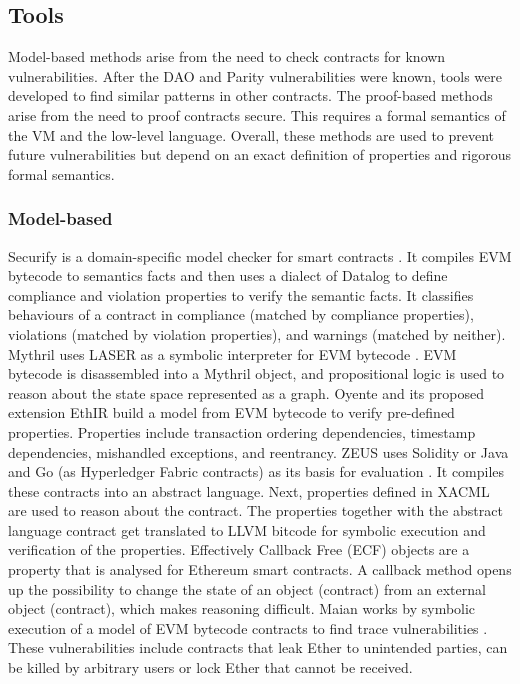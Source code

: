 


\subsection{Tools}
Model-based methods arise from the need to check contracts for known vulnerabilities. After the DAO and Parity vulnerabilities were known, tools were developed to find similar patterns in other contracts. The proof-based methods arise from the need to proof contracts secure. This requires a formal semantics of the VM and the low-level language. Overall, these methods are used to prevent future vulnerabilities but depend on an exact definition of properties and rigorous formal semantics.

\subsubsection{Model-based}
Securify is a domain-specific model checker for smart contracts \cite{Tsankov2017}. It compiles EVM bytecode to semantics facts and then uses a dialect of Datalog to define compliance and violation properties to verify the semantic facts. It classifies behaviours of a contract in compliance (matched by compliance properties), violations (matched by violation properties), and warnings (matched by neither). 
Mythril uses LASER as a symbolic interpreter for EVM bytecode \cite{Mueller2018}. EVM bytecode is disassembled into a Mythril object, and propositional logic is used to reason about the state space represented as a graph. 
Oyente \cite{Luu2016} and its proposed extension EthIR \cite{Albert2018} build a model from EVM bytecode to verify pre-defined properties. Properties include transaction ordering dependencies, timestamp dependencies, mishandled exceptions, and reentrancy.
ZEUS uses Solidity or Java and Go (as Hyperledger Fabric contracts) as its basis for evaluation \cite{Kalra2018}. It compiles these contracts into an abstract language. Next, properties defined in XACML are used to reason about the contract. The properties together with the abstract language contract get translated to LLVM bitcode for symbolic execution and verification of the properties.
Effectively Callback Free (ECF) objects are a property that is analysed for Ethereum smart contracts\cite{Grossman2017}. A callback method opens up the possibility to change the state of an object (contract) from an external object (contract), which makes reasoning difficult. 
Maian works by symbolic execution of a model of EVM bytecode contracts to find trace vulnerabilities \cite{Nikolic2018}. These vulnerabilities include contracts that leak Ether to unintended parties, can be killed by arbitrary users or lock Ether that cannot be received.

